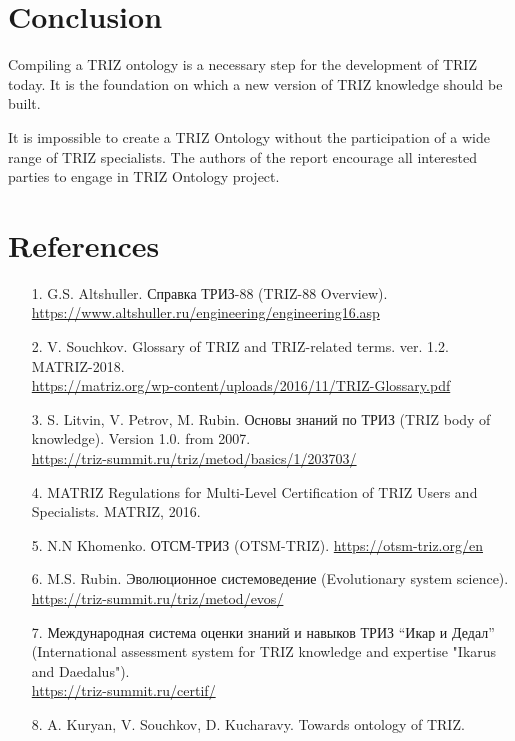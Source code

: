 \documentclass[11pt,a4paper]{article}
\begin{document}
\section{Conclusion}

Compiling a TRIZ ontology is a necessary step for the development of TRIZ
today. It is the foundation on which a new version of TRIZ knowledge should be
built.

It is impossible to create a TRIZ Ontology without the participation of a wide
range of TRIZ specialists.  The authors of the report encourage all interested
parties to engage in TRIZ Ontology project.

\section{References}
\begin{itemize}[leftmargin=18pt]
\item[1.] G.S. Altshuller. \foreignlanguage{russian}{Справка ТРИЗ-88} (TRIZ-88
  Overview).\\ \url{https://www.altshuller.ru/engineering/engineering16.asp}
\item[2.] V. Souchkov. Glossary of TRIZ and TRIZ-related terms.  ver. 1.2.
  MATRIZ-2018.\\
  \url{https://matriz.org/wp-content/uploads/2016/11/TRIZ-Glossary.pdf}
\item[3.] S. Litvin, V. Petrov, M. Rubin. \foreignlanguage{russian}{Основы
  знаний по ТРИЗ} (TRIZ body of knowledge). Version 1.0. from
  2007.\\ \url{https://triz-summit.ru/triz/metod/basics/1/203703/}
\item[4.] MATRIZ Regulations for Multi-Level Certification of TRIZ Users and
  Specialists.  MATRIZ, 2016.
\item[5.] N.N Khomenko. \foreignlanguage{russian}{ОТСМ-ТРИЗ} (OTSM-TRIZ).
  \url{https://otsm-triz.org/en}
\item[6.] M.S. Rubin. \foreignlanguage{russian}{Эволюционное системоведение}
  (Evolutionary system
  science).\\ \url{https://triz-summit.ru/triz/metod/evos/}
\item[7.] \foreignlanguage{russian}{Международная система оценки знаний и навыков ТРИЗ “Икар и
  Дедал”} (International assessment system for TRIZ knowledge and expertise
  "Ikarus and Daedalus").\\ \url{https://triz-summit.ru/certif/}
\item[8.] A. Kuryan, V. Souchkov, D. Kucharavy. Towards ontology of TRIZ.

\end{itemize}
\end{document}
